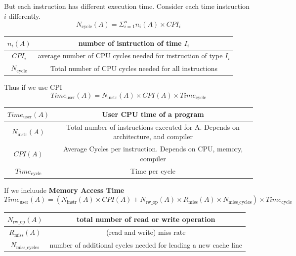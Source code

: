 \documentclass{article}
\begin{document}
But each instruction has different execution time. Consider each time instruction $i$ differently.
\[
    N_\text{cycle} \left( A \right) = \Sigma_{i=1}^n n_i \left( A \right) \times CPI_i
\]
\begin{center}
    \begin{tabular}{ |c|c| }
        \hline
        $n_i \left( A \right)$ & number of isntruction of time $I_i$                               \\
        \hline
        $CPI_i$                & average number of CPU cycles needed for instruction of type $I_i$ \\
        \hline
        $N_{\text{cycle}}$     & Total number of CPU cycles needed for all instructions            \\
        \hline
    \end{tabular}
\end{center}
Thus if we use CPI
\[
    Time_\text{user}\left( A \right) = N_\text{instr} \left( A \right) \times CPI(A) \times Time_\text{cycle}
\]
\begin{center}
    \begin{tabular}{ |c|c| }
        \hline
        $Time_\text{user}\left( A \right)$ & User CPU time of a program                                                         \\
        \hline
        $N_\text{instr} \left( A \right)$  & Total number of instructions executed for A. Depends on architecture, and compiler \\
        \hline
        $CPI(A)$                           & Average Cycles per instruction. Depends on CPU, memory, compiler                   \\
        \hline
        $Time_\text{cycle}$                & Time per cycle                                                                     \\
        \hline
    \end{tabular}
\end{center}

If we incluude \textbf{Memory Access Time}
\[
    Time_\text{user}\left( A \right) = \left( N_\text{instr} \left( A \right)  \times CPI \left( A \right) + N_\text{rw\_op} \left( A \right) \times R_\text{miss} \left( A \right) \times N_\text{miss\_cycles} \right) \times Time_\text{cycle}
\]
\begin{center}
    \begin{tabular}{ |c|c| }
        \hline
        $N_\text{rw\_op} \left( A \right)$ & total number of read or write operation                         \\
        \hline
        $R_\text{miss} \left( A \right)$   & (read and write) miss rate                                      \\
        \hline
        $N_\text{miss\_cycles}$            & number of additional cycles needed for leading a new cache line \\
        \hline
    \end{tabular}
\end{center}
\end{document}

